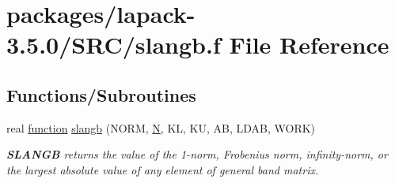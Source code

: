 \hypertarget{slangb_8f}{}\section{packages/lapack-\/3.5.0/\+S\+R\+C/slangb.f File Reference}
\label{slangb_8f}
\subsection*{Functions/\+Subroutines}
\begin{DoxyCompactItemize}
\item 
real \hyperlink{afunc_8m_a7b5e596df91eadea6c537c0825e894a7}{function} \hyperlink{group__realGBauxiliary_gaf4b60512534024c921af88def5b806b7}{slangb} (N\+O\+R\+M, \hyperlink{polmisc_8c_a0240ac851181b84ac374872dc5434ee4}{N}, K\+L, K\+U, A\+B, L\+D\+A\+B, W\+O\+R\+K)
\begin{DoxyCompactList}\small\item\em {\bfseries S\+L\+A\+N\+G\+B} returns the value of the 1-\/norm, Frobenius norm, infinity-\/norm, or the largest absolute value of any element of general band matrix. \end{DoxyCompactList}\end{DoxyCompactItemize}
